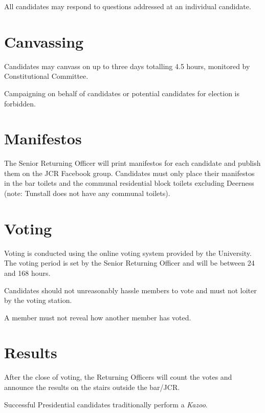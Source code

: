 \documentclass[12pt]{article}
\begin{document}
    All candidates may respond to questions addressed at an individual candidate.

    \section{Canvassing}
    Candidates may canvass on up to three days totalling 4.5 hours, monitored by Constitutional Committee.

    Campaigning on behalf of candidates or potential candidates for election is forbidden.

    \section{Manifestos}
    The Senior Returning Officer will print manifestos for each candidate and publish them on the JCR Facebook group. Candidates must only place their manifestos in the bar toilets and the communal residential block toilets excluding Deerness (note: Tunstall does not have any communal toilets).

    \section{Voting}
    Voting is conducted using the online voting system provided by the University.
    The voting period is set by the Senior Returning Officer and will be between 24 and 168 hours.

    Candidates should not unreasonably hassle members to vote and must not loiter by the voting station.

    A member must not reveal how another member has voted.

    \section{Results}
    After the close of voting, the Returning Officers will count the votes and announce the results on the stairs outside the bar/JCR.

    Successful Presidential candidates traditionally perform a \emph{Kazoo}.
\end{document}
